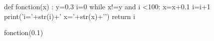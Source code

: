 
\begin{pycode}
def fonction(x) :
    y=0.3
    i=0
    while x!=y and i <100:
        x=x+0.1
        i=i+1
        print('i='+str(i)+' x='+str(x)+'\n')
    return i

fonction(0.1)
\end{pycode}